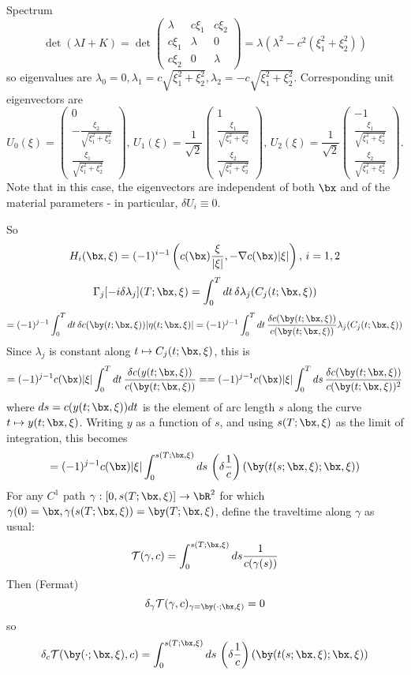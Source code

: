Spectrum
\[
  \det (\lambda I + K) = \det
  \left(
    \begin{array}{ccc}
      \lambda & c\xi_1 & c\xi_2 \\
      c\xi_1 & \lambda & 0 \\
      c\xi_2 & 0 & \lambda
    \end{array}
  \right)
  = \lambda(\lambda^2 - c^2(\xi_1^2 + \xi_2^2))
\]
so eigenvalues are $\lambda_0=0, \lambda_1 = c\sqrt{\xi_1^2 +
  \xi_2^2}, \lambda_2=-c\sqrt{\xi_1^2 +  \xi_2^2}$. Corresponding unit
eigenvectors are
\[
  U_0(\xi) = \left(
    \begin{array}{c}
      0\\
      -\frac{\xi_2}{\sqrt{\xi_1^2 + \xi_2^2}}\\
      \frac{\xi_1}{\sqrt{\xi_1^2 + \xi_2^2}}
    \end{array}
  \right),\,
  U_1(\xi) = \frac{1}{\sqrt{2}}\left(
    \begin{array}{c}
      1\\
      \frac{\xi_1}{\sqrt{\xi_1^2 + \xi_2^2}}\\
      \frac{\xi_2}{\sqrt{\xi_1^2 + \xi_2^2}}
    \end{array}
  \right),\,
  U_2(\xi) = \frac{1}{\sqrt{2}}\left(
    \begin{array}{c}
      -1\\
      \frac{\xi_1}{\sqrt{\xi_1^2 + \xi_2^2}}\\
      \frac{\xi_2}{\sqrt{\xi_1^2 + \xi_2^2}}
    \end{array}
  \right).                     
\]
Note that in this case, the eigenvectors are independent of both $\bx$
and of the material parameters - in particular, $\delta U_i \equiv 0$.

So
\[
  H_i(\bx,\xi) = (-1)^{i-1}\left(c(\bx)\frac{\xi}{|\xi|}, - \nabla
    c(\bx)|\xi|
  \right),\,i=1,2
\]
\[
\Gamma_j[ -i \delta \lambda_j](T;\bx,\xi) = \int_0^T dt \, \delta \lambda_j(C_j(t;\bx,\xi))
\]
\[
= (-1)^{j-1}\int_0^T dt \, \delta c(\by(t;\bx,\xi))|\eta(t;\bx,\xi)|
= (-1)^{j-1}\int_0^T dt \, \frac{\delta c(\by(t;\bx,\xi))}
{c(\by(t;\bx,\xi))}\lambda_j(C_j(t;\bx,\xi))
\]
Since $\lambda_j$ is constant along $t \mapsto C_j(t;\bx,\xi)$, this
is
\[
  = (-1)^{j-1}c(\bx)|\xi|\int_0^T dt \, \frac{\delta c(y(t;\bx,\xi))}
{c(\by(t;\bx,\xi))} = = (-1)^{j-1}c(\bx)|\xi|\int_0^T ds \, \frac{\delta c(\by(t;\bx,\xi))}
{c(\by(t;\bx,\xi))^2} 
\]
where $ds= c(y(t;\bx,\xi))dt $ is the element of arc length $s$ along the
curve $t \mapsto y(t;\bx,\xi)$. Writing $y$ as a function of $s$, and
using $s(T;\bx,\xi)$ as the limit of integration, this becomes
\[
  = (-1)^{j-1} c(\bx)|\xi| \int_0^{s(T;\bx,\xi)} ds\, \left(\delta
    \frac{1}{c}\right) (\by(t(s;\bx,\xi);\bx,\xi))
\]
For any $C^1$ path $\gamma: [0,s(T;\bx,\xi)] \rightarrow \bR^2$ for
which $\gamma(0) = \bx, \gamma(s(T;\bx,\xi))=\by(T;\bx,\xi)$, define the
traveltime along $\gamma$ as usual:
\[
  {\cal T}(\gamma,c) = \int_0^{s(T;\bx,\xi)} ds \frac{1}{c(\gamma(s))}
\]
Then (Fermat)
\[
  \delta_{\gamma} {\cal T}(\gamma,c)_{\gamma=\by(\cdot;\bx,\xi)} = 0
\]
so
\[
  \delta_{c} {\cal T}(\by(\cdot;\bx,\xi),c)=\int_0^{s(T;\bx,\xi)} ds\, \left(\delta
    \frac{1}{c}\right) (\by(t(s;\bx,\xi);\bx,\xi))
\]


